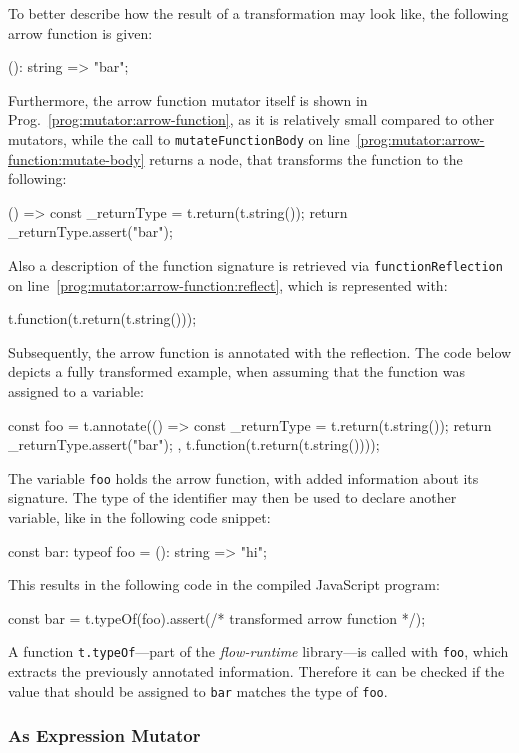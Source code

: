 \pagebreak
\noindent
To better describe how the result of a transformation may look like, the following arrow function is given:
\begin{JsCode}[numbers=none]
(): string => "bar";
\end{JsCode}
Furthermore, the arrow function mutator itself is shown in Prog.~\ref{prog:mutator:arrow-function}, as it is relatively small compared to other mutators, while the call to \texttt{mutateFunctionBody} on line~\ref{prog:mutator:arrow-function:mutate-body} returns a node, that transforms the function to the following:
\begin{JsCode}[numbers=none]
() => {
  const _returnType = t.return(t.string());
  return _returnType.assert("bar");
}
\end{JsCode}
Also a description of the function signature is retrieved via \texttt{functionReflection} on line~\ref{prog:mutator:arrow-function:reflect}, which is represented with:
\begin{JsCode}[numbers=none]
t.function(t.return(t.string()));
\end{JsCode}
Subsequently, the arrow function is annotated with the reflection. The code below depicts a fully transformed example, when assuming that the function was assigned to a variable:
\begin{JsCode}[numbers=none]
const foo = t.annotate(() => {
  const _returnType = t.return(t.string());
  return _returnType.assert("bar");
}, t.function(t.return(t.string())));
\end{JsCode}
The variable \texttt{foo} holds the arrow function, with added information about its signature. The type of the identifier may then be used to declare another variable, like in the following code snippet:
\begin{JsCode}[numbers=none]
const bar: typeof foo = (): string => "hi";
\end{JsCode}
This results in the following code in the compiled JavaScript program:
\begin{JsCode}[numbers=none]
const bar = t.typeOf(foo).assert(/* transformed arrow function */);
\end{JsCode}
A function \texttt{t.typeOf}---part of the \emph{flow-runtime} library---is called with \texttt{foo}, which extracts the previously annotated information. Therefore it can be checked if the value that should be assigned to \texttt{bar} matches the type of \texttt{foo}.

\subsubsection{As Expression Mutator}

